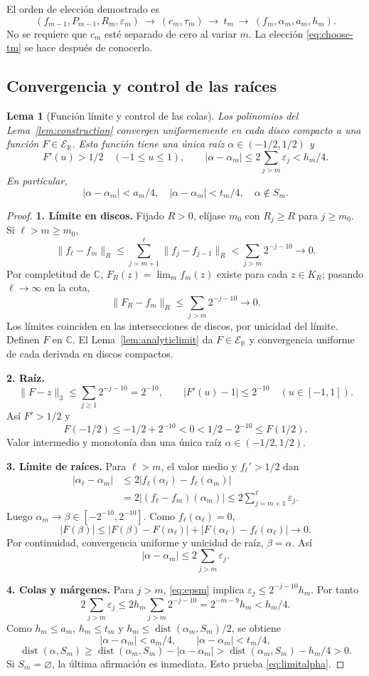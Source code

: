 \documentclass[11pt,a4paper]{article}
\numberwithin{equation}{section}
\newtheorem{lemma}[theorem]{Lema}
\theoremstyle{definition}
\theoremstyle{remark}
\newcommand{\R}{\mathbb R}
\newcommand{\C}{\mathbb C}
\newcommand{\ER}{\mathcal E_{\R}}
\DeclareMathOperator{\dist}{dist}
\newcommand{\paso}[1]{\par\smallskip\noindent\textbf{#1}\quad}
\begin{document}
El orden de elección demostrado es
\[
(f_{m-1},P_{m-1},R_m,\varepsilon_m)
\ \longrightarrow\ (c_m,\tau_m)
\ \longrightarrow\ t_m
\ \longrightarrow\ (f_m,\alpha_m,a_m,h_m).
\]
No se requiere que $c_m$ esté separado de cero al variar $m$. La elección \eqref{eq:choose-tm} se hace después de conocerlo.

\subsection{Convergencia y control de las raíces}
\begin{lemma}[Función límite y control de las colas]\label{lem:tails}
Los polinomios del Lema~\ref{lem:construction} convergen uniformemente en cada disco compacto a una función $F\in\ER$. Esta función tiene una única raíz $\alpha\in(-1/2,1/2)$ y
\[
F'(u)>1/2\quad(-1\le u\le1),\qquad
|\alpha-\alpha_m|\le2\sum_{j>m}\varepsilon_j<h_m/4.
\]
En particular,
\begin{equation}\label{eq:limitalpha}
|\alpha-\alpha_m|<a_m/4,\quad
|\alpha-\alpha_m|<t_m/4,\quad \alpha\notin S_m.
\end{equation}
\end{lemma}
\begin{proof}
\paso{1. Límite en discos.}
Fijado $R>0$, elíjase $m_0$ con $R_j\ge R$ para $j\ge m_0$. Si $\ell>m\ge m_0$,
\[
\|f_\ell-f_m\|_R\le\sum_{j=m+1}^\ell\|f_j-f_{j-1}\|_R
<\sum_{j>m}2^{-j-10}\longrightarrow0.
\]
Por completitud de $\C$, $F_R(z)=\lim_m f_m(z)$ existe para cada $z\in K_R$; pasando $\ell\to\infty$ en la cota,
\[
\|F_R-f_m\|_R\le\sum_{j>m}2^{-j-10}\to0.
\]
Los límites coinciden en las intersecciones de discos, por unicidad del límite. Definen $F$ en $\C$. El Lema~\ref{lem:analyticlimit} da $F\in\ER$ y convergencia uniforme de cada derivada en discos compactos.
\paso{2. Raíz.}
\[
\|F-z\|_3\le\sum_{j\ge1}2^{-j-10}=2^{-10},\qquad
|F'(u)-1|\le2^{-10}\quad(u\in[-1,1]).
\]
Así $F'>1/2$ y
\[
F(-1/2)\le-1/2+2^{-10}<0<1/2-2^{-10}\le F(1/2).
\]
Valor intermedio y monotonía dan una única raíz $\alpha\in(-1/2,1/2)$.
\paso{3. Límite de raíces.}
Para $\ell>m$, el valor medio y $f_\ell'>1/2$ dan
\begin{align*}
|\alpha_\ell-\alpha_m|
&\le2|f_\ell(\alpha_\ell)-f_\ell(\alpha_m)|\\
&=2|(f_\ell-f_m)(\alpha_m)|\le2\sum_{j=m+1}^{\ell}\varepsilon_j.
\end{align*}
Luego $\alpha_m\to\beta\in[-2^{-10},2^{-10}]$. Como $f_\ell(\alpha_\ell)=0$,
\[
|F(\beta)|\le|F(\beta)-F(\alpha_\ell)|+
|F(\alpha_\ell)-f_\ell(\alpha_\ell)|\longrightarrow0.
\]
Por continuidad, convergencia uniforme y unicidad de raíz, $\beta=\alpha$. Así
\[
|\alpha-\alpha_m|\le2\sum_{j>m}\varepsilon_j.
\]
\paso{4. Colas y márgenes.}
Para $j>m$, \eqref{eq:epsm} implica $\varepsilon_j\le2^{-j-10}h_m$. Por tanto
\[
2\sum_{j>m}\varepsilon_j\le2h_m\sum_{j>m}2^{-j-10}
=2^{-m-9}h_m<h_m/4.
\]
Como $h_m\le a_m$, $h_m\le t_m$ y $h_m\le\dist(\alpha_m,S_m)/2$, se obtiene
\[
|\alpha-\alpha_m|<a_m/4,\qquad|\alpha-\alpha_m|<t_m/4,
\]
\[
\dist(\alpha,S_m)\ge\dist(\alpha_m,S_m)-|\alpha-\alpha_m|
>\dist(\alpha_m,S_m)-h_m/4>0.
\]
Si $S_m=\varnothing$, la última afirmación es inmediata. Esto prueba \eqref{eq:limitalpha}.
\end{proof}
\end{document}
